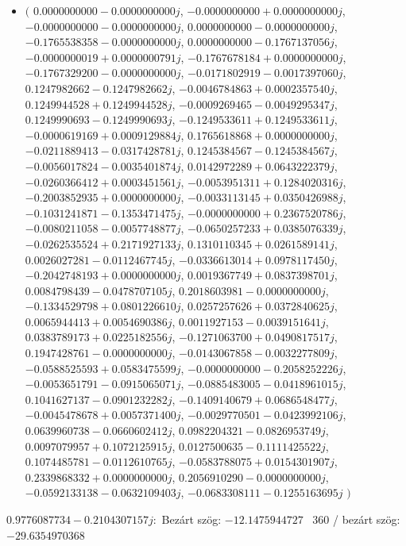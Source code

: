 \documentclass[14pt,a4paper]{article}
\begin{document}
\begin{itemize}
\item
$\big($
$0.0000000000-0.0000000000j$, $-0.0000000000+0.0000000000j$, $-0.0000000000-0.0000000000j$, $0.0000000000-0.0000000000j$, $-0.1765538358-0.0000000000j$, $0.0000000000-0.1767137056j$, $-0.0000000019+0.0000000791j$, $-0.1767678184+0.0000000000j$, $-0.1767329200-0.0000000000j$, $-0.0171802919-0.0017397060j$, $0.1247982662-0.1247982662j$, $-0.0046784863+0.0002357540j$, $0.1249944528+0.1249944528j$, $-0.0009269465-0.0049295347j$, $0.1249990693-0.1249990693j$, $-0.1249533611+0.1249533611j$, $-0.0000619169+0.0009129884j$, $0.1765618868+0.0000000000j$, $-0.0211889413-0.0317428781j$, $0.1245384567-0.1245384567j$, $-0.0056017824-0.0035401874j$, $0.0142972289+0.0643222379j$, $-0.0260366412+0.0003451561j$, $-0.0053951311+0.1284020316j$, $-0.2003852935+0.0000000000j$, $-0.0033113145+0.0350426988j$, $-0.1031241871-0.1353471475j$, $-0.0000000000+0.2367520786j$, $-0.0080211058-0.0057748877j$, $-0.0650257233+0.0385076339j$, $-0.0262535524+0.2171927133j$, $0.1310110345+0.0261589141j$, $0.0026027281-0.0112467745j$, $-0.0336613014+0.0978117450j$, $-0.2042748193+0.0000000000j$, $0.0019367749+0.0837398701j$, $0.0084798439-0.0478707105j$, $0.2018603981-0.0000000000j$, $-0.1334529798+0.0801226610j$, $0.0257257626+0.0372840625j$, $0.0065944413+0.0054690386j$, $0.0011927153-0.0039151641j$, $0.0383789173+0.0225182556j$, $-0.1271063700+0.0490817517j$, $0.1947428761-0.0000000000j$, $-0.0143067858-0.0032277809j$, $-0.0588525593+0.0583475599j$, $-0.0000000000-0.2058252226j$, $-0.0053651791-0.0915065071j$, $-0.0885483005-0.0418961015j$, $0.1041627137-0.0901232282j$, $-0.1409140679+0.0686548477j$, $-0.0045478678+0.0057371400j$, $-0.0029770501-0.0423992106j$, $0.0639960738-0.0660602412j$, $0.0982204321-0.0826953749j$, $0.0097079957+0.1072125915j$, $0.0127500635-0.1111425522j$, $0.1074485781-0.0112610765j$, $-0.0583788075+0.0154301907j$, $0.2339868332+0.0000000000j$, $0.2056910290-0.0000000000j$, $-0.0592133138-0.0632109403j$, $-0.0683308111-0.1255163695j$
$\big)$
\end{itemize}
$0.9776087734-0.2104307157j$:\
Bezárt szög: $-12.1475944727$ \
360 / bezárt szög: $-29.6354970368$\
\end{document}

